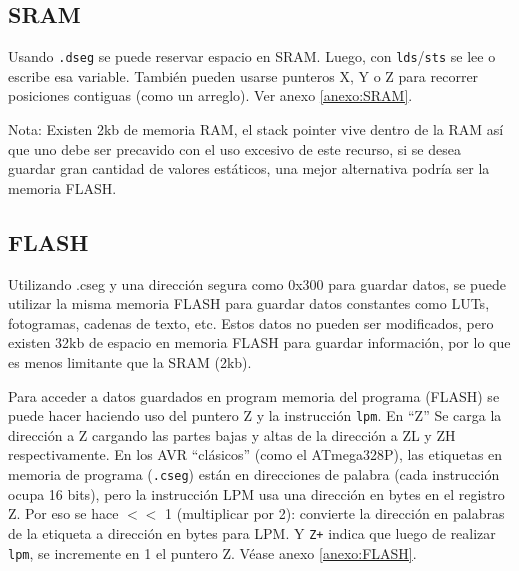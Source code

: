 \subsection{SRAM}

Usando \texttt{.dseg} se puede reservar espacio en SRAM. Luego, con \texttt{lds}/\texttt{sts} se lee o escribe esa variable. También pueden usarse punteros X, Y o Z para recorrer posiciones contiguas (como un arreglo). Ver anexo \ref{anexo:SRAM}.

Nota: Existen 2kb de memoria RAM, el stack pointer vive dentro de la RAM así que uno debe ser precavido con el uso excesivo de este recurso, si se desea guardar gran cantidad de valores estáticos, una mejor alternativa podría ser la memoria FLASH.

\newpage

\subsection{FLASH}

Utilizando .cseg y una dirección segura como 0x300 para guardar datos, se puede utilizar la misma memoria FLASH para guardar datos constantes como LUTs, fotogramas, cadenas de texto, etc. Estos datos no pueden ser modificados, pero existen 32kb de espacio en memoria FLASH para guardar información, por lo que es menos limitante que la SRAM (2kb).

Para acceder a datos guardados en program memoria del programa (FLASH) se puede hacer haciendo uso del puntero Z y la instrucción \texttt{lpm}. En ``Z'' Se carga la dirección a Z cargando las partes bajas y altas de la dirección a ZL y ZH respectivamente. En los AVR  ``clásicos'' (como el ATmega328P), las etiquetas en memoria de programa (\texttt{.cseg}) están en direcciones de palabra (cada instrucción ocupa 16 bits), pero la instrucción LPM usa una dirección en bytes en el registro Z. Por eso se hace $<$$<$ 1 (multiplicar por 2): convierte la dirección en palabras de la etiqueta a dirección en bytes para LPM. Y \texttt{Z+} indica que luego de realizar \texttt{lpm}, se incremente en 1 el puntero Z. Véase anexo \ref{anexo:FLASH}.


